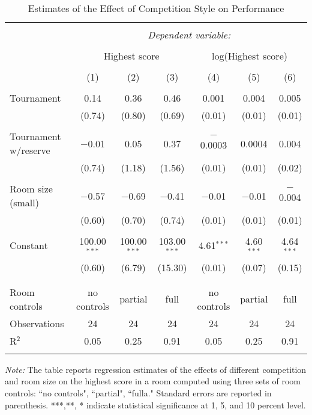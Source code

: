 \documentclass[10pt, titlepage]{article}
\begin{document}
\begin{table}
\centering
\caption{Estimates of the Effect of Competition Style on Performance}\label{ols entry}
\begin{tabular}{@{}lcccccc}
\\[-1.8ex]\hline 
\hline \\[-1.8ex] 
 & \multicolumn{6}{c}{\textit{Dependent variable:}} \\ 
\cline{2-7} 
\\[-1.8ex] & \multicolumn{3}{c}{Highest score} & \multicolumn{3}{c}{log(Highest score)} \\ 
\\[-1.8ex] & (1) & (2) & (3) & (4) & (5) & (6)\\ 
\hline \\[-1.8ex] 
 Tournament & 0.14 & 0.36 & 0.46 & 0.001 & 0.004 & 0.005 \\ 
  & (0.74) & (0.80) & (0.69) & (0.01) & (0.01) & (0.01) \\ 
  & & & & & & \\ 
 Tournament w/reserve & $-$0.01 & 0.05 & 0.37 & $-$0.0003 & 0.0004 & 0.004 \\ 
  & (0.74) & (1.18) & (1.56) & (0.01) & (0.01) & (0.02) \\ 
  & & & & & & \\ 
 Room size (small) & $-$0.57 & $-$0.69 & $-$0.41 & $-$0.01 & $-$0.01 & $-$0.004 \\ 
  & (0.60) & (0.70) & (0.74) & (0.01) & (0.01) & (0.01) \\ 
  & & & & & & \\ 
 Constant & 100.00$^{***}$ & 100.00$^{***}$ & 103.00$^{***}$ & 4.61$^{***}$ & 4.60$^{***}$ & 4.64$^{***}$ \\ 
  & (0.60) & (6.79) & (15.30) & (0.01) & (0.07) & (0.15) \\ 
  & & & & & & \\ 
\hline \\[-1.8ex] 
Room controls & no controls & partial & full & no controls & partial & full \\ 
Observations & 24 & 24 & 24 & 24 & 24 & 24 \\ 
R$^{2}$ & 0.05 & 0.25 & 0.91 & 0.05 & 0.25 & 0.91 \\ 
\hline 
\hline \\[-1.8ex] 
\end{tabular} 
\begin{minipage}{1.000000\textwidth}
\footnotesize\emph{Note:} The table reports regression estimates of the effects of different competition and room size on the highest score in a room computed using three sets of room controls: ``no controls", ``partial", ``fulla." Standard errors are reported in parenthesis. ***,**, * indicate statistical significance at 1, 5, and 10 percent level.
\end{minipage}
\end{table}
\end{document}
